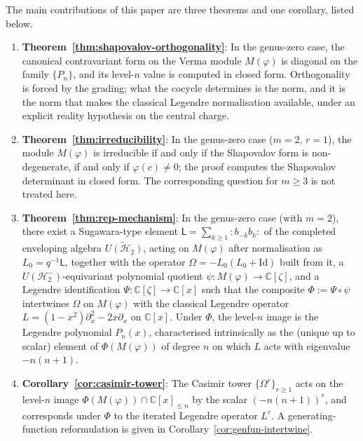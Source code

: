 \documentclass[12pt]{amsart}
\theoremstyle{plain}
\theoremstyle{definition}
\newcommand{\CC}{\mathbb{C}}
\newcommand{\Lalg}{{\mathsf{L}}}
\newcommand{\Mf}{M(\varphi)}          %
\newcommand{\Pn}{\{P_n\}}             %
\newcommand{\Om}{\Omega}              %
\begin{document}
The main contributions of this paper are three theorems and one corollary,
listed below.

\begin{enumerate}[label=(\Alph*)]
  \item \textbf{Theorem~\ref{thm:shapovalov-orthogonality}}:
    In the genus-zero case, the canonical contravariant form on the
    Verma module $\Mf$ is diagonal on the family $\Pn$, and
    its level-$n$ value is computed in closed form. Orthogonality is
    forced by the grading; what the cocycle determines is the norm, and
    it is the norm that makes the classical Legendre normalisation
    available, under an explicit reality hypothesis on the central
    charge.

  \item \textbf{Theorem~\ref{thm:irreducibility}}:
    In the genus-zero case ($m = 2$, $r = 1$), the module $\Mf$ is
    irreducible if and only if the Shapovalov form is non-degenerate,
    if and only if $\varphi(c)\neq 0$; the proof computes the
    Shapovalov determinant in closed form. The corresponding question
    for $m \geq 3$ is not treated here.

  \item \textbf{Theorem~\ref{thm:rep-mechanism}}:
    In the genus-zero case (with $m = 2$), there exist a Sugawara-type
element $\Lalg = \sum_{k\ge1}{:}b_{-k}b_k{:}$ of the completed
    enveloping algebra $\widetilde{U(\mathcal{H}_2)}$, acting on $\Mf$
    after normalisation as $L_0 = q^{-1}\Lalg$, together with the
    operator $\Om = -L_0(L_0+\mathrm{Id})$ built from it, a
    $U(\mathcal{H}_2^-)$-equivariant
    polynomial quotient $\psi\colon\Mf \to \CC[\zeta]$, and a Legendre identification
    $\Psi\colon\CC[\zeta]\to\CC[x]$ such that the composite $\Phi := \Psi\circ\psi$
    intertwines $\Om$ on $\Mf$ with the classical Legendre operator
    $L = (1-x^2)\partial_x^2 - 2x\partial_x$ on $\CC[x]$. Under $\Phi$, the
    level-$n$ image is the Legendre polynomial $P_n(x)$, characterised
    intrinsically as the (unique up to scalar) element of $\Phi(\Mf)$ of degree
    $n$ on which $L$ acts with eigenvalue $-n(n+1)$.

  \item \textbf{Corollary~\ref{cor:casimir-tower}}:
    The Casimir tower $\{\Om^r\}_{r\geq 1}$ acts on the level-$n$ image
    $\Phi(\Mf)\cap\CC[x]_{\leq n}$ by the scalar $(-n(n+1))^r$, and corresponds
    under $\Phi$ to the iterated Legendre operator $L^r$. A generating-function
    reformulation is given in Corollary~\ref{cor:genfun-intertwine}.
\end{enumerate}
\end{document}

